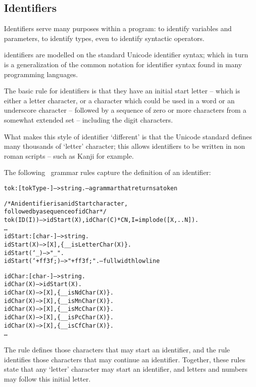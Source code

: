 \subsection{Identifiers}
\label{token:identifier}
Identifiers serve many purposes within a \go program: to identify variables and parameters, to identify types, even to identify syntactic operators.

\go identifiers are modelled on the standard Unicode identifier syntax; which in turn is a generalization of the common notation for identifier syntax found in many programming languages.

The basic rule for identifiers is that they have an initial start letter -- which is either a letter character, or a character which could be used in a word or an underscore character -- followed by a sequence of zero or more characters from a somewhat extended set -- including the digit characters. 

\begin{aside}
What makes this style of identifier `different' is that the Unicode standard defines many thousands of `letter' character; this allows identifiers to be written in non roman scripts -- such as Kanji for example.
\end{aside}

The following \go\ grammar rules capture the definition of an identifier:
\begin{alltt}
tok:[tokType-]-->string.		-- a grammar that returns a token

/* An identifier is an idStart character, 
   followed by a sequence of idChar */
tok(ID(I)) --> idStart(X), idChar(C)*C\uphat{}N, I=implode([X,..N]).
\dots
idStart:[char-]-->string.
idStart(X) --> [X],\{\_\_isLetterChar(X)\}.
idStart(`\_) --> "\_".
idStart(`\bsl{}+ff3f;) --> "\bsl{}+ff3f;".		-- full width low line
  
idChar:[char-]-->string.
idChar(X) --> idStart(X).
idChar(X) --> [X],\{\_\_isNdChar(X)\}.
idChar(X) --> [X],\{\_\_isMnChar(X)\}.
idChar(X) --> [X],\{\_\_isMcChar(X)\}.
idChar(X) --> [X],\{\_\_isPcChar(X)\}.
idChar(X) --> [X],\{\_\_isCfChar(X)\}.
\dots
\end{alltt}

The  rule defines those characters that may start an identifier, and the  rule identifies those characters that may continue an identifier. Together, these rules state that any `letter' character may start an identifier, and letters and numbers may follow this initial letter. 

